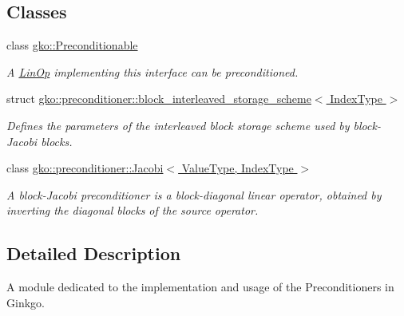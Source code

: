 \subsection*{Classes}
\begin{DoxyCompactItemize}
\item 
class \hyperlink{classgko_1_1Preconditionable}{gko\+::\+Preconditionable}
\begin{DoxyCompactList}\small\item\em A \hyperlink{classgko_1_1LinOp}{Lin\+Op} implementing this interface can be preconditioned. \end{DoxyCompactList}\item 
struct \hyperlink{structgko_1_1preconditioner_1_1block__interleaved__storage__scheme}{gko\+::preconditioner\+::block\+\_\+interleaved\+\_\+storage\+\_\+scheme$<$ Index\+Type $>$}
\begin{DoxyCompactList}\small\item\em Defines the parameters of the interleaved block storage scheme used by block-\/\+Jacobi blocks. \end{DoxyCompactList}\item 
class \hyperlink{classgko_1_1preconditioner_1_1Jacobi}{gko\+::preconditioner\+::\+Jacobi$<$ Value\+Type, Index\+Type $>$}
\begin{DoxyCompactList}\small\item\em A block-\/\+Jacobi preconditioner is a block-\/diagonal linear operator, obtained by inverting the diagonal blocks of the source operator. \end{DoxyCompactList}\end{DoxyCompactItemize}


\subsection{Detailed Description}
A module dedicated to the implementation and usage of the Preconditioners in Ginkgo. 

